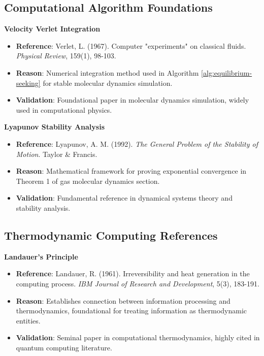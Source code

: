 \subsection{Computational Algorithm Foundations}

\textbf{Velocity Verlet Integration}
\begin{itemize}
\item \textbf{Reference}: Verlet, L. (1967). Computer "experiments" on classical fluids. \textit{Physical Review}, 159(1), 98-103.
\item \textbf{Reason}: Numerical integration method used in Algorithm \ref{alg:equilibrium-seeking} for stable molecular dynamics simulation.
\item \textbf{Validation}: Foundational paper in molecular dynamics simulation, widely used in computational physics.
\end{itemize}

\textbf{Lyapunov Stability Analysis}
\begin{itemize}
\item \textbf{Reference}: Lyapunov, A. M. (1992). \textit{The General Problem of the Stability of Motion}. Taylor \& Francis.
\item \textbf{Reason}: Mathematical framework for proving exponential convergence in Theorem 1 of gas molecular dynamics section.
\item \textbf{Validation}: Fundamental reference in dynamical systems theory and stability analysis.
\end{itemize}

\subsection{Thermodynamic Computing References}

\textbf{Landauer's Principle}
\begin{itemize}
\item \textbf{Reference}: Landauer, R. (1961). Irreversibility and heat generation in the computing process. \textit{IBM Journal of Research and Development}, 5(3), 183-191.
\item \textbf{Reason}: Establishes connection between information processing and thermodynamics, foundational for treating information as thermodynamic entities.
\item \textbf{Validation}: Seminal paper in computational thermodynamics, highly cited in quantum computing literature.
\end{itemize}

